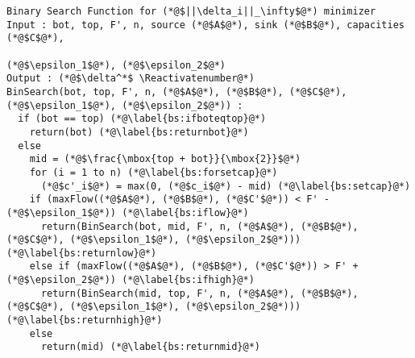 {}
\Suppressnumber
\begin{lstlisting}[label=binsearch, style=numbers]
Binary Search Function for (*@$||\delta_i||_\infty$@*) minimizer
Input : bot, top, F', n, source (*@$A$@*), sink (*@$B$@*), capacities (*@$C$@*),
                                                      (*@$\epsilon_1$@*), (*@$\epsilon_2$@*)
Output : (*@$\delta^*$ \Reactivatenumber@*)
BinSearch(bot, top, F', n, (*@$A$@*), (*@$B$@*), (*@$C$@*), (*@$\epsilon_1$@*), (*@$\epsilon_2$@*)) :
  if (bot == top) (*@\label{bs:ifboteqtop}@*)
    return(bot) (*@\label{bs:returnbot}@*)
  else
    mid = (*@$\frac{\mbox{top + bot}}{\mbox{2}}$@*)
    for (i = 1 to n) (*@\label{bs:forsetcap}@*)
      (*@$c'_i$@*) = max(0, (*@$c_i$@*) - mid) (*@\label{bs:setcap}@*)
    if (maxFlow((*@$A$@*), (*@$B$@*), (*@$C'$@*)) < F' - (*@$\epsilon_1$@*)) (*@\label{bs:iflow}@*)
      return(BinSearch(bot, mid, F', n, (*@$A$@*), (*@$B$@*), (*@$C$@*), (*@$\epsilon_1$@*), (*@$\epsilon_2$@*))) (*@\label{bs:returnlow}@*)
    else if (maxFlow((*@$A$@*), (*@$B$@*), (*@$C'$@*)) > F' + (*@$\epsilon_2$@*)) (*@\label{bs:ifhigh}@*)
      return(BinSearch(mid, top, F', n, (*@$A$@*), (*@$B$@*), (*@$C$@*), (*@$\epsilon_1$@*), (*@$\epsilon_2$@*))) (*@\label{bs:returnhigh}@*)
    else
      return(mid) (*@\label{bs:returnmid}@*)
\end{lstlisting}
